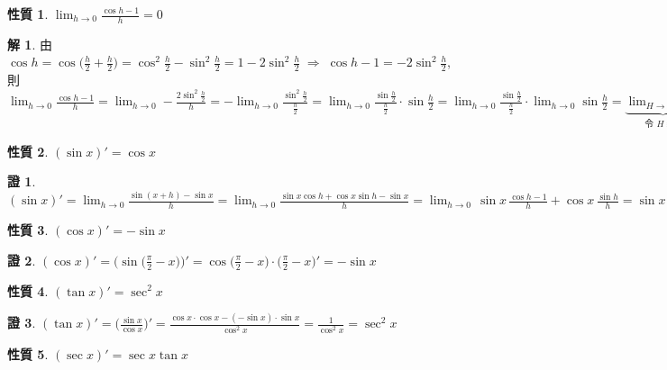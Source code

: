 \documentclass[12pt]{extarticle}
\newcommand{\ds}{\displaystyle}
\newcommand{\ie}{\;\Longrightarrow\;}
\theoremstyle{definition}
\newtheorem*{prp}{性質}
\newtheorem*{sol}{解}
\newtheorem*{prf}{證}
\begin{document}
\begin{prp}
  $\ds\lim_{h\to 0}\frac{\cos h - 1}{h} = 0$
\end{prp}

\begin{sol}
  由 $\ds\cos h = \cos\Big(\frac{h}{2} + \frac{h}{2}\Big) = \cos^2\!\frac{h}{2} - \sin^2\!\frac{h}{2} = 1 - 2\sin^2\!\frac{h}{2}\ie\cos h - 1 = -2 \sin^2\!\frac{h}{2}$, 則 $\ds\lim_{h\to 0}\frac{\cos h - 1}{h} = \lim_{h\to 0}-\frac{2\sin^2\!\frac{h}{2}}{h} = -\lim_{h\to 0}\frac{\sin^2\!\frac{h}{2}}{\frac{h}{2}} = \lim_{h\to 0}\frac{\sin\frac{h}{2}}{\frac{h}{2}}\cdot\sin\frac{h}{2} = \lim_{h\to 0}\frac{\sin\frac{h}{2}}{\frac{h}{2}}\cdot\lim_{h\to 0}\sin\frac{h}{2} = \underbrace{\lim_{H\to 0}\frac{\sin H}{H}}_{\text{令 $H\equiv\frac{h}{2}$}}\cdot\lim_{h\to 0}\sin\frac{h}{2} = 1\cdot 0 = 0$
\end{sol}

\begin{prp}
  $\ds(\sin x)' = \cos x$
\end{prp}

\begin{prf}
  $\ds(\sin x)' = \lim_{h\to 0}\frac{\sin(x + h) - \sin x}{h} = \lim_{h\to 0}\frac{\sin x\cos h + \cos x\sin h - \sin x}{h} = \lim_{h\to 0}\,\sin x\,\frac{\cos h - 1}{h} + \cos x\,\frac{\sin h}{h} = \sin x\,\lim_{h\to 0}\frac{\cos h - 1}{h} + \cos x\,\lim_{h\to 0}\frac{\sin h}{h} = \cos x$
\end{prf}

\begin{prp}
  $\ds(\cos x)' = -\sin x$
\end{prp}

\begin{prf}
  $\ds(\cos x)' = \Big(\sin\Big(\frac{\pi}{2} - x\Big)\Big)' = \cos\Big(\frac{\pi}{2} - x\Big)\cdot\Big(\frac{\pi}{2} - x\Big)' = -\sin x$
\end{prf}

\begin{prp}
  $\ds(\tan x)' = \sec^2 x$
\end{prp}

\begin{prf}
  $\ds(\tan x)' = \Big(\frac{\sin x}{\cos x}\Big)' = \frac{\cos x\cdot\cos x - (-\sin x)\cdot\sin x}{\cos^2 x} = \frac{1}{\cos^2 x} = \sec^2 x$
\end{prf}

\begin{prp}
  $\ds(\sec x)' = \sec x\tan x$
\end{prp}
\end{document}
